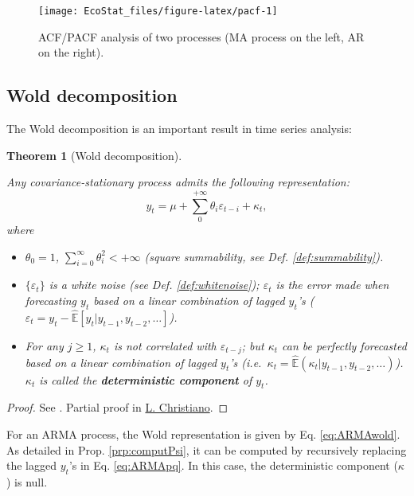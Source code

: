 \documentclass[
  12pt,
]{book}
\providecommand{\tightlist}{%
  \setlength{\itemsep}{0pt}\setlength{\parskip}{0pt}}
\newtheorem{theorem}{Theorem}[chapter]
\theoremstyle{definition}
\theoremstyle{definition}
\theoremstyle{definition}
\theoremstyle{definition}
\theoremstyle{remark}
\begin{document}
\begin{figure}
\texttt{[image: EcoStat\_files/figure-latex/pacf-1]} \caption{ACF/PACF analysis of two processes (MA process on the left, AR on the right).}\label{fig:pacf}
\end{figure}

\hypertarget{wold-decomposition}{%
\subsection{Wold decomposition}\label{wold-decomposition}}

The Wold decomposition is an important result in time series analysis:

\begin{theorem}[Wold decomposition]
\protect\hypertarget{thm:Wold}{}\label{thm:Wold}

Any covariance-stationary process admits the following representation:
\[
y_t = \mu + \sum_{0}^{+\infty} \theta_i \varepsilon_{t-i} + \kappa_t,
\]
where

\begin{itemize}
\tightlist
\item
  \(\theta_0 = 1\), \(\sum_{i=0}^{\infty} \theta_i^2 < +\infty\) (square summability, see Def. \ref{def:summability}).
\item
  \(\{\varepsilon_t\}\) is a white noise (see Def. \ref{def:whitenoise}); \(\varepsilon_t\) is the error made when forecasting \(y_t\) based on a linear combination of lagged \(y_t\)'s (\(\varepsilon_t = y_t - \hat{\mathbb{E}}[y_t|y_{t-1},y_{t-2},\dots]\)).
\item
  For any \(j \ge 1\), \(\kappa_t\) is not correlated with \(\varepsilon_{t-j}\); but \(\kappa_t\) can be perfectly forecasted based on a linear combination of lagged \(y_t\)'s (i.e.~\(\kappa_t = \hat{\mathbb{E}}(\kappa_t|y_{t-1},y_{t-2},\dots)\)). \(\kappa_t\) is called the \textbf{deterministic component} of \(y_t\).
\end{itemize}

\end{theorem}

\begin{proof}
See \citet{Anderson_1971}. Partial proof in \href{http://faculty.wcas.northwestern.edu/~lchrist/finc520/wold.pdf}{L. Christiano}.
\end{proof}

For an ARMA process, the Wold representation is given by Eq. \eqref{eq:ARMAwold}. As detailed in Prop. \ref{prp:computPsi}, it can be computed by recursively replacing the lagged \(y_t\)'s in Eq. \eqref{eq:ARMApq}. In this case, the deterministic component (\(\kappa\)) is null.
\end{document}
